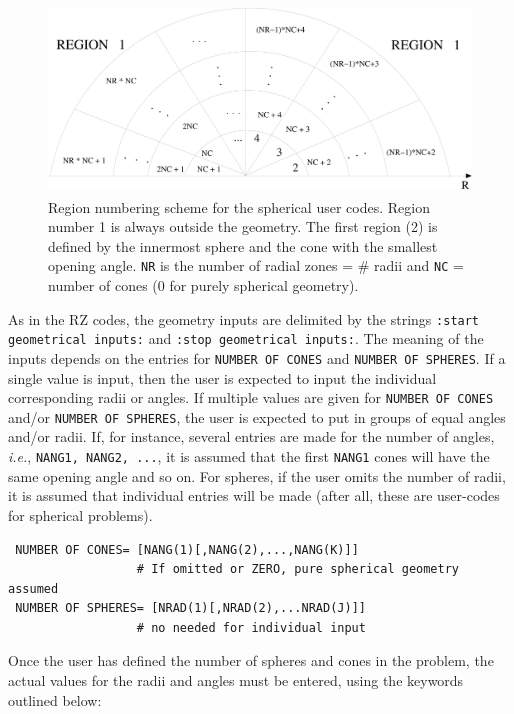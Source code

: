 \documentclass[12pt,twoside]{article}  %
\newcommand{\ie}{{\em i.e.}}
\begin{document}
\begin{figure}[hbt]
\begin{center}
\includegraphics[height=5cm]{figures/spherical}
\end{center}
\caption[Spherical geometry]{Region numbering scheme for the spherical
user codes.  Region number 1 is always outside the geometry. The first
region (2) is defined by the innermost sphere and the cone with the
smallest opening angle. {\tt NR} is the number of radial zones = \# radii
and {\tt NC} = number of cones (0 for purely spherical geometry). }
\label{fig_spherical}
\end{figure}

As in the RZ codes, the geometry inputs are delimited by the strings
{\tt :start geometrical inputs:} and {\tt:stop geometrical inputs:}. The
meaning of the inputs depends on the entries for {\tt NUMBER OF CONES}  and
{\tt NUMBER OF SPHERES}. If a single value is input, then the user is
expected to input the individual corresponding radii or angles. If multiple
values are given for {\tt NUMBER OF CONES}  and/or {\tt NUMBER OF SPHERES},
the user is expected to put in groups of equal angles and/or radii.
If, for instance, several
entries are made for the number of angles, \ie, {\tt NANG1, NANG2, ...}, it
is assumed that the first {\tt NANG1} cones will have the same opening angle
and so on. For spheres, if the user omits the number of radii, it is
assumed that individual entries will be made (after all,
these are user-codes for spherical problems).

\begin{verbatim}
 NUMBER OF CONES= [NANG(1)[,NANG(2),...,NANG(K)]]
                  # If omitted or ZERO, pure spherical geometry assumed
 NUMBER OF SPHERES= [NRAD(1)[,NRAD(2),...NRAD(J)]]
                  # no needed for individual input
\end{verbatim}

Once the user has defined the number of spheres and cones in the problem, the
actual values for the radii and angles must be entered, using the keywords
outlined below:
\end{document}
